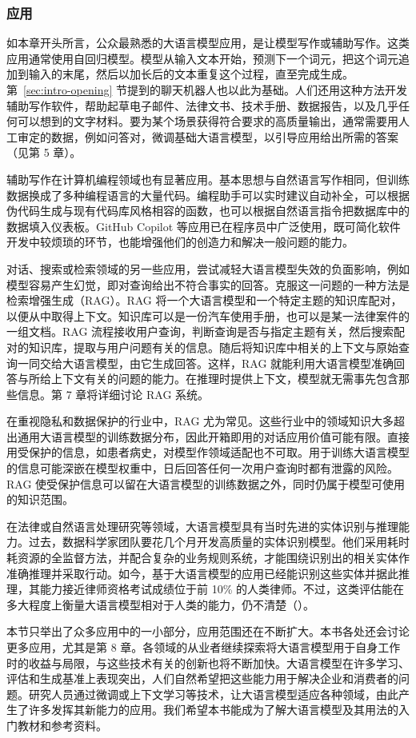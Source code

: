 \subsubsection{应用}
如本章开头所言，公众最熟悉的大语言模型应用，是让模型写作或辅助写作。这类应用通常使用自回归模型。模型从输入文本开始，预测下一个词元，把这个词元追加到输入的末尾，然后以加长后的文本重复这个过程，直至完成生成。第~\ref{sec:intro-opening} 节提到的聊天机器人也以此为基础。人们还用这种方法开发辅助写作软件，帮助起草电子邮件、法律文书、技术手册、数据报告，以及几乎任何可以想到的文字材料。要为某个场景获得符合要求的高质量输出，通常需要用人工审定的数据，例如问答对，微调基础大语言模型，以引导应用给出所需的答案（见第 5 章）。

辅助写作在计算机编程领域也有显著应用。基本思想与自然语言写作相同，但训练数据换成了多种编程语言的大量代码。编程助手可以实时建议自动补全，可以根据伪代码生成与现有代码库风格相容的函数，也可以根据自然语言指令把数据库中的数据填入仪表板。GitHub Copilot 等应用已在程序员中广泛使用，既可简化软件开发中较烦琐的环节，也能增强他们的创造力和解决一般问题的能力。

对话、搜索或检索领域的另一些应用，尝试减轻大语言模型失效的负面影响，例如模型容易产生幻觉，即对查询给出不符合事实的回答。克服这一问题的一种方法是检索增强生成（RAG）。RAG 将一个大语言模型和一个特定主题的知识库配对，以便从中取得上下文。知识库可以是一份汽车使用手册，也可以是某一法律案件的一组文档。RAG 流程接收用户查询，判断查询是否与指定主题有关，然后搜索配对的知识库，提取与用户问题有关的信息。随后将知识库中相关的上下文与原始查询一同交给大语言模型，由它生成回答。这样，RAG 就能利用大语言模型准确回答与所给上下文有关的问题的能力。在推理时提供上下文，模型就无需事先包含那些信息。第 7 章将详细讨论 RAG 系统。

在重视隐私和数据保护的行业中，RAG 尤为常见。这些行业中的领域知识大多超出通用大语言模型的训练数据分布，因此开箱即用的对话应用价值可能有限。直接用受保护的信息，如患者病史，对模型作领域适配也不可取。用于训练大语言模型的信息可能深嵌在模型权重中，日后回答任何一次用户查询时都有泄露的风险。RAG 使受保护信息可以留在大语言模型的训练数据之外，同时仍属于模型可使用的知识范围。

在法律或自然语言处理研究等领域，大语言模型具有当时先进的实体识别与推理能力。过去，数据科学家团队要花几个月开发高质量的实体识别模型。他们采用耗时耗资源的全监督方法，并配合复杂的业务规则系统，才能围绕识别出的相关实体作准确推理并采取行动。如今，基于大语言模型的应用已经能识别这些实体并据此推理，其能力接近律师资格考试成绩位于前 10\% 的人类律师。不过，这类评估能在多大程度上衡量大语言模型相对于人类的能力，仍不清楚（）。

本节只举出了众多应用中的一小部分，应用范围还在不断扩大。本书各处还会讨论更多应用，尤其是第 8 章。各领域的从业者继续探索将大语言模型用于自身工作时的收益与局限，与这些技术有关的创新也将不断加快。大语言模型在许多学习、评估和生成基准上表现突出，人们自然希望把这些能力用于解决企业和消费者的问题。研究人员通过微调或上下文学习等技术，让大语言模型适应各种领域，由此产生了许多发挥其新能力的应用。我们希望本书能成为了解大语言模型及其用法的入门教材和参考资料。
